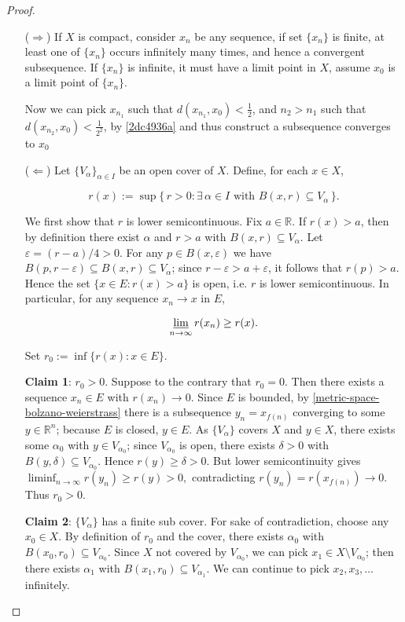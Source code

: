 \begin{proof}
    \begin{enumerate}
        \item[($\Rightarrow$)]
        If $X$ is compact, consider $x_n$ be any sequence, if set $\{ x_n \}$ is finite, at least 
    one of $\{ x_n \}$ occurs infinitely many times, and hence a convergent subsequence. 
    If $\{ x_n \}$ is infinite, it must have a limit point in $X$, assume $x_0$ is a limit point of $\{ x_n \}$.

    Now we can pick $x_{n_1}$ such that $d(x_{n_1}, x_0) < \frac{1}{2}$, and $n_2 > n_1$ such that 
    $d(x_{n_2}, x_0) < \frac{1}{2^2}$, by \cref{2dc4936a} and thus construct a subsequence converges to $x_0$

        \item[($\Leftarrow$)]
Let $\{V_\alpha\}_{\alpha \in I}$ be an open cover of $X$. Define, for each $x \in X$,

\[
  r(x) := \sup\{\, r > 0 : \exists\, \alpha \in I \text{ with } B(x,r) \subseteq V_\alpha \,\}.
\]


We first show that $r$ is lower semicontinuous. Fix $a \in \mathbb{R}$. 
If $r(x) > a$,
then by definition there exist $\alpha$ and $r>a$ with $B(x,r) \subseteq V_\alpha$.
Let $\varepsilon = (r-a)/4 > 0$. For any $p \in B(x,\varepsilon)$ we have
$B(p,r-\varepsilon) \subseteq B(x,r) \subseteq V_\alpha$; since $r-\varepsilon > a+\varepsilon$,
it follows that $r(p) > a$. Hence the set $\{x \in E : r(x) > a\}$ is open, i.e. $r$ is
lower semicontinuous. In particular, for any sequence $x_n \to x$ in $E$,

\[
  \varliminf_{n \to \infty} r(x_n) \ge r(x).
\]

Set $r_0 := \inf\{ r(x) : x \in E \}$.

\textbf{Claim 1}: $r_0 > 0$. Suppose to the contrary that $r_0 = 0$. Then there exists a
sequence $x_n \in E$ with $r(x_n) \to 0$. Since $E$ is bounded, by \cref{metric-space-bolzano-weierstrass}
there is a subsequence $y_n = x_{f(n)}$ converging to some $y \in \mathbb{R}^n$; because
$E$ is closed, $y \in E$. As $\{V_\alpha\}$ covers $X$ and $y \in X$, there exists some
$\alpha_0$ with $y \in V_{\alpha_0}$; since $V_{\alpha_0}$ is open, there exists
$\delta>0$ with $B(y,\delta) \subseteq V_{\alpha_0}$. Hence $r(y) \ge \delta > 0$.
But lower semicontinuity gives
$
  \liminf_{n \to \infty} r(y_n) \ge r(y) > 0,
$
contradicting $r(y_n)=r(x_{f(n)}) \to 0$. Thus $r_0>0$.

\textbf{Claim 2}: $\{V_\alpha\}$ has a finite sub cover. For sake of contradiction, choose any $x_0 \in X$.
By definition of $r_0$ and the cover, there exists $\alpha_0$ with
$B(x_0,r_0) \subseteq V_{\alpha_0}$. Since $X$ not covered by $V_{\alpha_0}$,
we can pick $x_1 \in X \setminus V_{\alpha_0}$; then there exists $\alpha_1$
with $B(x_1,r_0) \subseteq V_{\alpha_1}$. We can continue to pick $x_2,x_3,\dots$ infinitely.


\end{enumerate}
\end{proof}
